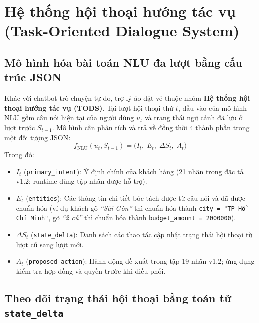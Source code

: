 \section{Hệ thống hội thoại hướng tác vụ (Task-Oriented Dialogue System)}
\label{sec:theory_tods}

\subsection{Mô hình hóa bài toán NLU đa lượt bằng cấu trúc JSON}

Khác với chatbot trò chuyện tự do, trợ lý ảo đặt vé thuộc nhóm \textbf{Hệ thống hội thoại hướng tác vụ (TODS)}. Tại lượt hội thoại thứ $t$, đầu vào của mô hình NLU gồm câu nói hiện tại của người dùng $u_t$ và trạng thái ngữ cảnh đã lưu ở lượt trước $S_{t-1}$. Mô hình cần phân tích và trả về đồng thời 4 thành phần trong một đối tượng JSON:
\begin{equation}
  f_{\text{NLU}}(u_t, S_{t-1}) = \big( I_t,\; E_t,\; \Delta S_t,\; A_t \big)
  \label{eq:nlu_formulation}
\end{equation}
Trong đó:
\begin{itemize}[nosep]
  \item $I_t$ (\texttt{primary\_intent}): Ý định chính của khách hàng (21 nhãn trong đặc tả v1.2; runtime dùng tập nhãn được hỗ trợ).
  \item $E_t$ (\texttt{entities}): Các thông tin chi tiết bóc tách được từ câu nói và đã được chuẩn hóa (ví dụ khách gõ \textit{``Sài Gòn''} thì chuẩn hóa thành \texttt{city = "TP Hồ Chí Minh"}, gõ \textit{``2 củ''} thì chuẩn hóa thành \texttt{budget\_amount = 2000000}).
  \item $\Delta S_t$ (\texttt{state\_delta}): Danh sách các thao tác cập nhật trạng thái hội thoại từ lượt cũ sang lượt mới.
  \item $A_t$ (\texttt{proposed\_action}): Hành động đề xuất trong tập 19 nhãn v1.2; ứng dụng kiểm tra hợp đồng và quyền trước khi điều phối.
\end{itemize}

\subsection{Theo dõi trạng thái hội thoại bằng toán tử \texttt{state\_delta}}

